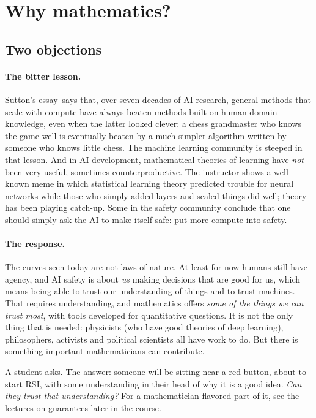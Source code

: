 \section{Why mathematics?}\label{sec:L1-math}
\subsection{Two objections}
\paragraph{The bitter lesson.}
Sutton's essay\,\citep{sutton2019} says that, over seven decades of AI research, general methods that scale with compute have always beaten methods built on human domain knowledge, even when the latter looked clever: a chess grandmaster who knows the game well is eventually beaten by a much simpler algorithm written
by someone who knows little chess. The machine learning community is steeped in that lesson. And in AI development, mathematical theories of learning have \emph{not} been very useful, sometimes counterproductive. The instructor shows a well-known meme in which statistical learning theory predicted trouble for neural networks while those
who simply added layers and scaled things did well; theory has been playing catch-up. Some in the safety community conclude that one should simply ask the AI to make itself safe: put more compute into safety.

\paragraph{The response.}
The curves seen today are not laws of nature. At least for now humans still have agency, and AI safety is about \emph{us} making decisions that are good for us, which means being able to trust our understanding of things and to trust machines. That requires understanding, and mathematics offers
\emph{some of the things we can trust most}, with tools developed for quantitative questions. It is not the only thing that is needed: physicists (who have good theories of deep learning), philosophers, activists and political scientists all have work to do. But there is something important mathematicians can contribute.

\begin{discussion}
A student asks. The answer: someone will be sitting near a red button, about to start RSI, with some understanding in their head of why it is a good idea. \emph{Can they trust that understanding?} For a mathematician-flavored part of it, see the lectures on guarantees later in the course.
\end{discussion}

